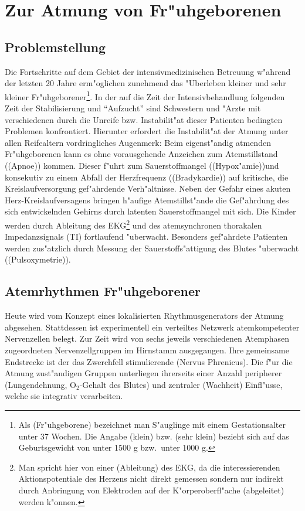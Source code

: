 \section{Zur Atmung von Fr"uhgeborenen}


\subsection{Problemstellung}

Die Fortschritte auf dem Gebiet der intensivmedizinischen Betreuung w"ahrend der letzten
20 Jahre erm"oglichen zunehmend das "Uberleben kleiner und sehr kleiner Fr"uhgeborener\footnote{Als
  \begriff(Fr"uhgeborene) bezeichnet man S"auglinge mit einem Gestationsalter unter 37
  Wochen. Die Angabe \naja(klein) bzw.  \naja(sehr klein) bezieht sich auf das
  Geburtsgewicht von unter 1500 g bzw.\ unter 1000 g.}.
In der auf die Zeit der Intensivbehandlung folgenden Zeit der
Stabilisierung und ``Aufzucht'' sind Schwestern und "Arzte mit verschiedenen durch die
Unreife bzw.  Instabilit"at dieser Patienten bedingten Problemen konfrontiert. Hierunter
erfordert die Instabilit"at der Atmung unter allen Reifealtern vordringliches Augenmerk:
Beim eigenst"andig atmenden Fr"uhgeborenen kann es ohne vorausgehende Anzeichen
zum Atemstillstand (\begriff(Apnoe)) kommen.  Dieser f"uhrt zum Sauerstoffmangel (\begriff(Hypox"amie))und
konsekutiv zu einem Abfall der Herzfrequenz (\begriff(Bradykardie)) auf kritische, die
Kreislaufversorgung gef"ahrdende Verh"altnisse.  Neben der Gefahr eines akuten
Herz-Kreislaufversagens bringen h"aufige Atemstillst"ande die Gef"ahrdung des sich
entwickelnden Gehirns durch latenten Sauerstoffmangel mit sich.  Die Kinder werden durch
Ableitung des EKG\footnote{Man spricht hier von einer \begriff(Ableitung) des EKG, da die 
  interessierenden Aktionspotentiale des Herzens nicht direkt gemessen sondern nur
  indirekt durch Anbringung von Elektroden auf der K"orperoberfl"ache \naja(abgeleitet)
  werden k"onnen.} und des atemsynchronen thorakalen Impedanzsignals (TI) fortlaufend
"uberwacht. Besonders gef"ahrdete Patienten werden zus"atzlich durch Messung der
Sauerstoffs"attigung des Blutes "uberwacht (\begriff(Pulsoxymetrie)).

\subsection{Atemrhythmen Fr"uhgeborener}

Heute wird vom Konzept eines lokalisierten Rhythmusgenerators der Atmung abgesehen.
Stattdessen ist experimentell ein verteiltes Netzwerk atemkompetenter Nervenzellen belegt.
Zur Zeit wird von sechs jeweils verschiedenen Atemphasen zugeordneten Nervenzellgruppen im
Hirnstamm ausgegangen. Ihre gemeinsame Endstrecke ist der das Zwerchfell stimulierende
\begriff(Nervus Phrenicus). Die f"ur die Atmung zust"andigen  Gruppen unterliegen ihrerseits einer Anzahl peripherer (Lungendehnung,
$\mathrm{O}_2$-Gehalt des Blutes) und zentraler  (Wachheit) Einfl"usse, welche sie
integrativ verarbeiten. 

